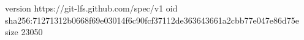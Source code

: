 version https://git-lfs.github.com/spec/v1
oid sha256:71271312b0668f69e03014f6c90fcf37112de363643661a2cbb77e047e86d75e
size 23050
